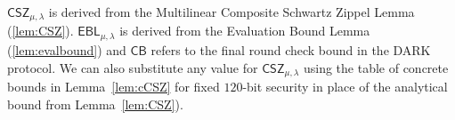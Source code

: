 \begin{remark} $\mathsf{CSZ}_{\mu, \lambda}$ is derived from the Multilinear Composite Schwartz Zippel Lemma (\cref{lem:CSZ}). $\mathsf{EBL}_{\mu, \lambda}$ is derived from the Evaluation Bound Lemma (\cref{lem:evalbound}) and $\mathsf{CB}$ refers to the final round check bound in the DARK protocol. We can also substitute any value for $\mathsf{CSZ}_{\mu,\lambda}$ using the table of concrete bounds in Lemma~\ref{lem:cCSZ} for fixed $120$-bit security in place of the analytical bound from Lemma~\ref{lem:CSZ}).%
\end{remark}



